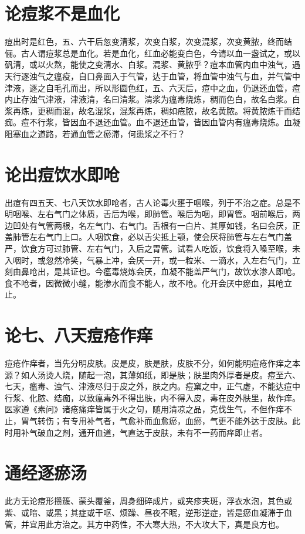 \documentclass[a4paper,12pt,UTF8,twoside]{ctexbook}
\begin{document}
	\section{论痘浆不是血化}
	痘出时是红色，五、六干后忽变清浆，次变白浆，次变混浆，次变黄脓，终而结俪。古人谓痘浆总是血化。若是血化，红血必能变白色，今请以血一盏试之，或以矾清，或以火熬，能使之变清水、白浆。混浆、黄脓乎？痘本血管内血中浊气，遇天行逐浊气之瘟疫，自口鼻面入于气管，达于血管，将血管中浊气与血，并气管中津液，逐之自毛孔而出，所以形圆色红，五、六天后，痘中之血，仍退还血管，痘内止存浊气津液，津液清，名曰清浆。清浆为瘟毒烧炼，稠而色白，故名白浆。白浆再炼，更稠而混，故名混浆，混浆再炼，稠如疮脓，故名黄脓。将黄脓炼干而结痂。痘不行浆，皆因血不退还血管。血不退还血管，皆因血管内有瘟毒烧炼。血凝阻塞血之道路，若通血管之瘀滞，何患浆之不行？
	\section{论出痘饮水即呛}
	出痘有四五天、七八天饮水即呛者，古人论毒火壅于咽喉，列于不治之症。总是不明咽喉、左右气门之体质，舌后为喉，即肺管。喉后为咽，即胃管。咽前喉后，两边凹处有气管两根，名左气门、右气门。舌根有一白片、其厚如钱，名曰会厌，正盖肺管左右气门上口。人咽饮食，必以舌尖抵上颚，使会厌将肺管与左右气门盖严，饮食方可过肺管、左右气门，入后之胃管。试看人吃饭，饮食将入嗓至喉，未入咽时，或忽然冷笑，气暴上冲，会厌一开，或一粒米、一滴水，入左右气门，立刻由鼻呛出，是其证也。今瘟毒烧炼会厌，血凝不能盖严气门，故饮水渗人即呛。食不呛者，因微微小缝，能渗水而食不能人，故不呛。化开会厌中瘀血，其呛立止。
	\section{论七、八天痘疮作痒}
	痘疮作痒者，当先分明皮肤。皮是皮，肤是肤，皮肤不分，如何能明痘疮作痒之本源？如人汤烫人烧，随起一泡，其薄如纸，即是肤；肤里肉外厚者是皮。痘至六、七天，瘟毒、浊气、津液尽归于皮之外，肤之内。痘窠之中，正气虚，不能达痘中行浆、化脓、结痂，以致瘟毒外不得出肤，内不得入皮，毒在皮外肤里，故作痒。医家遵《素问》诸疮痛痒皆属于火之句，随用清凉之品，克伐生气，不但作痒不止，胃气转伤；有专用补气者，气愈补而血愈瘀，血瘀，气更不能外达于皮肤。此时用补气破血之剂，通开血道，气直达于皮肤，未有不一药而痒即止者。
	\section{通经逐瘀汤}
	
	
	此方无论痘形攒簇、蒙头覆釜，周身细碎成片，或夹疹夹斑，浮衣水泡，其色或紫、或暗、或黑；其症或干呕、烦躁、昼夜不眠，逆形逆症，皆是瘀血凝滞于血管，并宜用此方治之。其方中药性，不大寒大热，不大攻大下，真是良方也。
	
\end{document}
